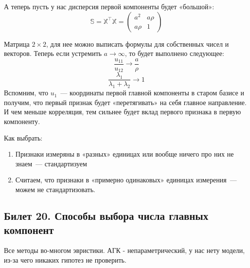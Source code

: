  А теперь пусть у нас дисперсия первой компоненты будет «большой»:
 $$\mathbb{S} = \mathbb{X}^{\intercal} \mathbb{X} = \begin{pmatrix}
a^2 & a\rho \\
a\rho & 1
\end{pmatrix}
$$

Матрица $2\times 2$, для нее можно выписать формулы для собственных чисел и векторов. Теперь если устремить $a \rightarrow \infty$, то  будет выполнено следующее:
$$\frac{u_{11}}{u_{12}} \rightarrow \frac{a}{\rho}$$
$$\frac{\lambda_1}{\lambda_1+\lambda_2} \rightarrow 1$$
Вспомним, что $u_{1}$ — координаты первой главной компоненты в старом базисе и получим, что первый признак будет «перетягивать» на себя главное направление. И чем меньше корреляция, тем сильнее будет вклад первого признака в первую компоненту. 

Как выбрать: 
\begin{enumerate}
\item Признаки измеряны в «разных» единицах или вообще ничего про них не знаем — стандартизуем
\item Считаем, что признаки в «примерно одинаковых» единицах измерения — можем не стандартизовать.
\end{enumerate}

 \subsection{Билет 20. Способы выбора числа главных компонент}
Все методы во-многом эвристики. АГК - непараметрический, у нас нету модели, из-за чего никаких гипотез не проверить.

